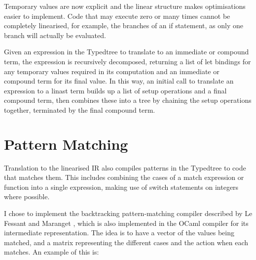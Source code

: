 Temporary values are now explicit and the linear structure makes optimisations easier to implement. Code that may execute zero or many times cannot be completely linearised, for example, the branches of an if statement, as only one branch will actually be evaluated. 

Given an expression in the Typedtree to translate to an immediate or compound term, the expression is recursively decomposed, returning a list of let bindings for any temporary values required in its computation and an immediate or compound term for its final value. In this way, an initial call to translate an expression to a linast term builds up a list of setup operations and a final compound term, then combines these into a tree by chaining the setup operations together, terminated by the final compound term.




\section{Pattern Matching}
Translation to the linearised IR also compiles patterns in the Typedtree to code that matches them. This includes combining the cases of a match expression or function into a single expression, making use of switch statements on integers where possible. 

I chose to implement the backtracking pattern-matching compiler described by Le Fessant and Maranget \cite{ocamlpatternmatch}, which is also implemented in the OCaml compiler for its intermediate representation. 
The idea is to have a vector of the values being matched, and a matrix representing the different cases and the action when each matches. An example of this is:

